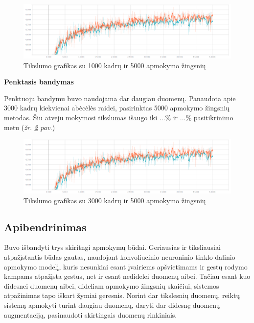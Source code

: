 \documentclass{VUMIFInfKursinis}
\begin{document}
\begin{figure}[H]
	\centering
	\includegraphics[width=.8\linewidth]{img/accuracy3}
	\caption{Tikslumo grafikas su 1000 kadrų ir 5000 apmokymo žingsnių}
	\label{img:acc3}
\end{figure}

\textbf{Penktasis bandymas}

Penktuoju bandymu buvo naudojama dar daugiau duomenų. Panaudota apie 3000 kadrų kiekvienai abėcėlės raidei, pasirinktas 5000 apmokymo žingsnių metodas. Šiu atveju mokymosi tikslumas išaugo iki ...\% ir ...\% pasitikrinimo metu (\textit{žr. \ref{img:acc4} pav.})

\begin{figure}[H]
	\centering
	\includegraphics[width=.8\linewidth]{img/accuracy3}
	\caption{Tikslumo grafikas su 3000 kadrų ir 5000 apmokymo žingsnių}
	\label{img:acc4}
\end{figure}

\subsection{Apibendrinimas}
Buvo išbandyti trys skiritngi apmokymų būdai. Geriausias ir tiksliausiai atpažįstantis būdas gautas, naudojant konvoliucinio neuroninio tinklo dalinio apmokymo modelį, kuris nesunkiai esant įvairiems apšvietimams ir gestų rodymo kampams atpažįsta gestus, net ir esant nedidelei duomenų aibei. Tačiau esant kuo didesnei duomenų aibei, dideliam apmokymo žingsnių skaičiui, sistemos atpažinimas tapo iškart žymiai geresnis. Norint dar tikslesnių duomenų, reiktų sistemą apmokyti turint daugiau duomenų, daryti dar didesnę duomenų augmentaciją, pasinaudoti skirtingais duomenų rinkiniais.
\end{document}

